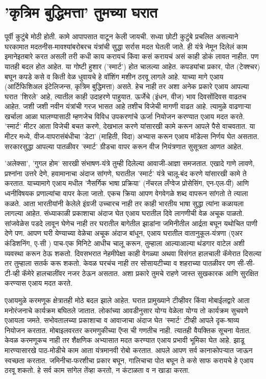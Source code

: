 \chapter{'कृत्रिम बुद्धिमत्ता' तुमच्या घरात}

पूर्वी कुटुंबे मोठी होती. कामे आपापसात वाटून केली जायची. सध्या छोटी कुटुंबे प्रचलित असल्याने घरकामात मदतनीस-मावश्यांबरोबरच यंत्रांची सुद्धा सर्रास मदत घेतली जाते. ही यंत्रे नेमून दिलेलं काम इमानेइतबारे करत असली तरी कधी काय करायचं किंवा कसं करायचं असं काही डोकं लावत नाहीत. पण यातही बदल होत आहेत. या गोष्टी हुशार ('स्मार्ट') होत चालल्या आहेत. कपड्यांचा प्रकार, पोत (टेक्श्चर) बघून कपडे कसे व किती वेळ धुवायचे हे वॉशिंग मशीन ठरवू लागले आहे. याच्या मागे एआय (आर्टिफिशिअल इंटेलिजन्स, कृत्रिम बुद्धिमत्ता) असते. हेच नाही तर अशा अनेक प्रकारे एआय आपल्या घरात 'शिरले' आहे, त्यातील काही उदाहरणे पाहुयात. ऊर्जेचे (इंधन, वीज) भाव दिवसोंदिवस वाढतच आहेत. जशी जशी नवीन यंत्रांची गरज भासत आहे तशीच विजेची मागणी वाढत आहे. त्यामुळे वाढणाऱ्या खर्चाला आळा घालण्यासाठी म्हणजेच विविध उपकरणांचे ऊर्जा नियोजन करण्यात एआय मदत करते. 'स्मार्ट' मीटर आता विजेची बचत करणे, देखभाल करणे यांसारखी कामे करून आपले पैसे वाचवतात. या मीटर मध्ये, वीज-वापरासंबंधीचा 'डेटा' (माहिती, विदा) अभ्यास करून एआय मॉडेल्स निर्णय घेत असतात. सरकारसुद्धा आपल्या पातळीवर 'स्मार्ट' ग्रीडचा वापर करून वीज नियंत्रणात सुसूत्रता आणत आहेत.

'अलेक्सा', 'गुगल होम' सारखी संभाषण-यंत्रे तुम्ही दिलेल्या आवाजी-आज्ञा समजतात. एखादे गाणे लावणे, प्रश्नांना उत्तरे देणे, हवामानाचा अंदाज सांगणे, घरातील 'स्मार्ट' यंत्रे चालू-बंद करणे यांसारखी कामे ते करतात. याच्यामागे एआय मधील 'नैसर्गिक भाषा प्रक्रिया' (नॅचरल लँग्वेज प्रोसेसिंग, एन-एल-पी) आणि ध्वनीविषयक प्रणाल्यांचा वापर केला जातो. एकच क्रिया आपण वेगवेगळे शब्द वापरून सांगतो ते त्याला कळते. आता भारतीयांनी केलेले इंग्रजी उच्चारच नाही तर काही भारतीय भाषा सुद्धा त्यांना कळायला लागल्या आहेत. संध्याकाळी प्रकाशाचा अंदाज घेत एआय घरातील दिवे लागणीची वेळ अचूक पाळतो. सांजवेळेस पडदे लावून घेणेच नाही तर घरातील बागेतील झाडांना जमिनीतील आर्द्रता बघून यथोचित पाणी देणे पण. आपण घरी येण्याच्या वेळेचा अचूक अंदाज बांधून, एआय घरातील वातानुकूल-यंत्रणा (एअर कंडिशनिंग, ए-सी ) पाच-एक मिनिटे आधीच चालू करून, तुम्हाला आल्याआल्या थंडगार वाटेल अशी व्यवस्था करून ठेऊ शकतो. दिवसभरात नेहमीपेक्षा काही वेगळ्या अथवा विसंगत हालचाली कॅमेरात दिसल्या तर तुम्हाला सतर्क करू शकतो. केवळ घरचंच नाही तर सोसायटीच्या व शहराच्या पातळीवर पण सी-सी-टी-व्ही कॅमेरे हालचालींवर नजर ठेऊन असतात. अशा प्रकारे तुमचे राहणे जास्त सुखकारक आणि सुरक्षित करण्यास एआय मदत करते.

एआयमुळे करमणूक क्षेत्रातही मोठे बदल झाले आहेत. घरात प्रामुख्याने टीव्हीवर किंवा मोबाईलद्वारे आता मनोरंजनाचे कार्यक्रम बघितले जातात. लोकांच्या आवडीनुसार योग्य वेळेला योग्य तो कार्यक्रम सुचवणे एआयला जमते. सभोवतालच्या प्रकाशाचा व आवाजाचा अंदाज घेत 'स्मार्ट' टीव्ही आपले दृक-श्राव्य नियोजन करतात. मोबाइलवरतर करमणुकीच्या ऍप्स ची गणतीच नाही. त्यातही वैयक्तिक सूचना येतात. केवळ करमणूकच नाही तर शैक्षणिक अभ्यासात मदत करण्यात एआय प्रभावी भूमिका घेत आहे. झाडू मारण्यासारखे पाठ-मोडीचे काम आता यंत्रमानवी रोबो करतात. आपले आपण सर्व कानाकोपऱ्यात जाऊन स्वच्छता करतात. जमिनीचा-फरशीचा प्रकार बघून, गालिचाचा पोत बघून ते कसे साफ करायचे हे एआय ठरवू शकतो. हे सर्व काम सांगेल तेंव्हा करतो, न कंटाळता व न खाडा करता.

